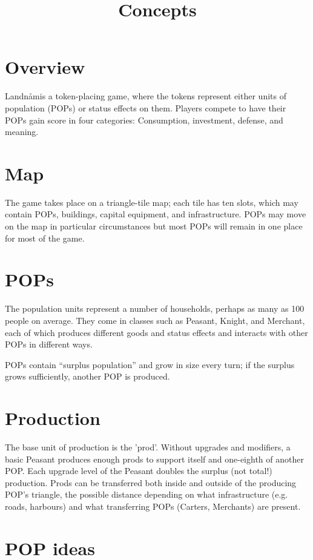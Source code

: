 \documentclass[12pt]{article}
\title{\gname Concepts}
\newcommand{\gname}{Landn{\aa}m}
\begin{document}
\maketitle
\section{Overview}

\gname is a token-placing game, where the tokens represent either
units of population (POPs) or status effects on them. Players compete
to have their POPs gain score in four categories: Consumption,
investment, defense, and meaning.

\section{Map}

The game takes place on a triangle-tile map; each tile has ten slots,
which may contain POPs, buildings, capital equipment, and
infrastructure. POPs may move on the map in particular circumstances
but most POPs will remain in one place for most of the game.

\section{POPs}

The population units represent a number of households, perhaps as many
as 100 people on average. They come in classes such as Peasant,
Knight, and Merchant, each of which produces different goods and
status effects and interacts with other POPs in different ways.

POPs contain ``surplus population'' and grow in size every turn; if
the surplus grows sufficiently, another POP is produced. 

\section{Production}

The base unit of production is the 'prod'. Without upgrades and
modifiers, a basic Peasant produces enough prods to support itself and
one-eighth of another POP. Each upgrade level of the Peasant doubles
the surplus (not total!) production. Prods can be transferred both
inside and outside of the producing POP's triangle, the possible
distance depending on what infrastructure (e.g. roads, harbours) and
what transferring POPs (Carters, Merchants) are present.

\section{POP ideas}
\end{document}
